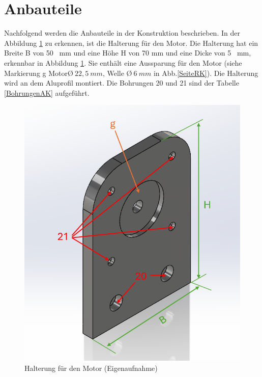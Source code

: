 \section{Anbauteile}

Nachfolgend werden die Anbauteile in der Konstruktion beschrieben. 
In der Abbildung \ref{FlankeMotorK} zu erkennen, ist die Halterung für den Motor. Die Halterung hat ein Breite B von 50 \ mm und eine Höhe H von 70 mm und eine Dicke von 5 \ mm, erkennbar in Abbildung \ref{FlankeMotorK}. Sie enthält eine Aussparung für den Motor (siehe Markierung g Motor\O $ \ 22,5 \ mm$, Welle \O $ \ 6 \ mm$  in Abb.\ref{SeiteRK}). Die Halterung wird an dem Aluprofil montiert. Die Bohrungen 20 und 21 sind der Tabelle \ref{BohrungenAK} aufgeführt. 
 
\begin{figure}[H]
	\begin{center}
		\includegraphics[width=\textwidth]{Images/Konstruktion/FlankeMotorK.png}
		\caption{Halterung für den Motor (Eigenaufnahme)} \label{FlankeMotorK}
	\end{center}
\end{figure}
 
